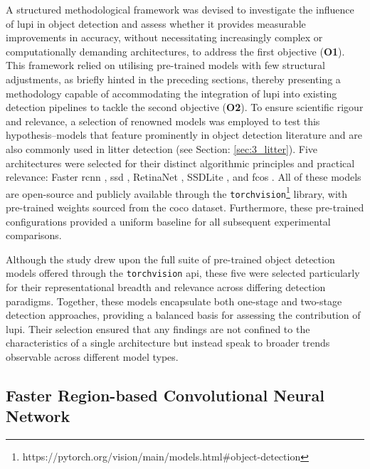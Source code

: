 A structured methodological framework was devised to investigate the influence of \gls{lupi} in object detection and assess whether it provides measurable improvements in accuracy, without necessitating increasingly complex or computationally demanding architectures, to address the first objective (\textbf{O1}). This framework relied on utilising pre-trained models with few structural adjustments, as briefly hinted in the preceding sections, thereby presenting a methodology capable of accommodating the integration of \gls{lupi} into existing detection pipelines to tackle the second objective (\textbf{O2}).
To ensure scientific rigour and relevance, a selection of renowned models was employed to test this hypothesis--models that feature prominently in object detection literature and are also commonly used in litter detection (see Section: \ref{sec:3_litter}). Five architectures were selected for their distinct algorithmic principles and practical relevance: Faster \gls{rcnn} \cite{rcnn}, \gls{ssd} \cite{ssd}, RetinaNet \cite{retinanet}, SSDLite \cite{ssdlite}, and \gls{fcos} \cite{fcos}. All of these models are open-source and publicly available through the \verb|torchvision|\footnote{https://pytorch.org/vision/main/models.html\#object-detection} library, with pre-trained weights sourced from the \gls{coco} dataset. Furthermore, these pre-trained configurations provided a uniform baseline for all subsequent experimental comparisons.

Although the study drew upon the full suite of pre-trained object detection models offered through the \verb|torchvision| \gls{api}, these five were selected particularly for their representational breadth and relevance across differing detection paradigms. Together, these models encapsulate both one-stage and two-stage detection approaches, providing a balanced basis for assessing the contribution of \gls{lupi}. Their selection ensured that any findings are not confined to the characteristics of a single architecture but instead speak to broader trends observable across different model types.

\subsection{Faster Region-based Convolutional Neural Network}
\label{subsec:4_fastercnn}

